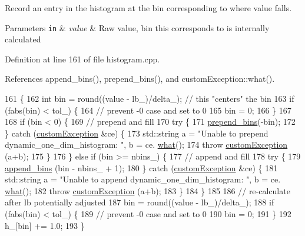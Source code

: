 Record an entry in the histogram at the bin corresponding to where value falls. 


\begin{DoxyParams}[1]{Parameters}
\mbox{\tt in}  & {\em value} & Raw value, bin this corresponds to is internally calculated \\
\hline
\end{DoxyParams}


Definition at line 161 of file histogram.\-cpp.



References append\-\_\-bins(), prepend\-\_\-bins(), and custom\-Exception\-::what().


\begin{DoxyCode}
161                                                           \{
162     \textcolor{keywordtype}{int} bin = round((value - lb\_)/delta\_); \textcolor{comment}{// this "centers" the bin}
163     \textcolor{keywordflow}{if} (fabs(bin) < tol\_) \{
164             \textcolor{comment}{// prevent -0 case and set to 0}
165             bin = 0;
166     \}
167 
168     \textcolor{keywordflow}{if} (bin < 0) \{
169         \textcolor{comment}{// prepend and fill}
170         \textcolor{keywordflow}{try} \{
171             \hyperlink{classdynamic__one__dim__histogram_a03402a7219e10240803609fb6cbb24a6}{prepend\_bins}(-bin);
172         \} \textcolor{keywordflow}{catch} (\hyperlink{classcustom_exception}{customException} &ce) \{
173             std::string a = \textcolor{stringliteral}{"Unable to prepend dynamic\_one\_dim\_histogram: "}, b = ce.
      \hyperlink{classcustom_exception_aeb6ab5848b038adfc68fde86a512f691}{what}();
174             \textcolor{keywordflow}{throw} \hyperlink{classcustom_exception}{customException} (a+b);
175         \}
176     \} \textcolor{keywordflow}{else} \textcolor{keywordflow}{if} (bin >= nbins\_) \{
177         \textcolor{comment}{// append and fill}
178         \textcolor{keywordflow}{try} \{
179             \hyperlink{classdynamic__one__dim__histogram_a6fa516279d227e363aa90baf29f8a181}{append\_bins} (bin - nbins\_ + 1);
180         \} \textcolor{keywordflow}{catch} (\hyperlink{classcustom_exception}{customException} &ce) \{
181             std::string a = \textcolor{stringliteral}{"Unable to append dynamic\_one\_dim\_histogram: "}, b = ce.
      \hyperlink{classcustom_exception_aeb6ab5848b038adfc68fde86a512f691}{what}();
182             \textcolor{keywordflow}{throw} \hyperlink{classcustom_exception}{customException} (a+b);
183         \}
184     \}
185 
186     \textcolor{comment}{// re-calculate after lb potentially adjusted}
187     bin = round((value - lb\_)/delta\_);
188     \textcolor{keywordflow}{if} (fabs(bin) < tol\_) \{
189             \textcolor{comment}{// prevent -0 case and set to 0}
190             bin = 0;
191     \}
192     h\_[bin] += 1.0;
193 \}
\end{DoxyCode}
